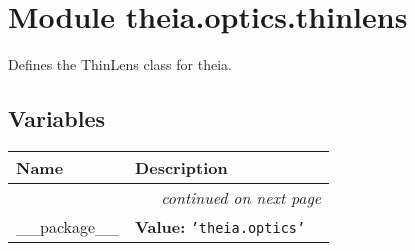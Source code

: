 %
%
%


\section{Module theia.optics.thinlens}

    \label{theia:optics:thinlens}
Defines the ThinLens class for theia.



  \subsection{Variables}

    \vspace{-1cm}
\hspace{\varindent}\begin{longtable}{|p{\varnamewidth}|p{\vardescrwidth}|l}
\cline{1-2}
\cline{1-2} \centering \textbf{Name} & \centering \textbf{Description}& \\
\cline{1-2}
\endhead\cline{1-2}\multicolumn{3}{r}{\small\textit{continued on next page}}\\\endfoot\cline{1-2}
\endlastfoot\raggedright \_\-\_\-p\-a\-c\-k\-a\-g\-e\-\_\-\_\- & \raggedright \textbf{Value:} 
{\tt \texttt{'}\texttt{theia.optics}\texttt{'}}&\\
\cline{1-2}
\end{longtable}



